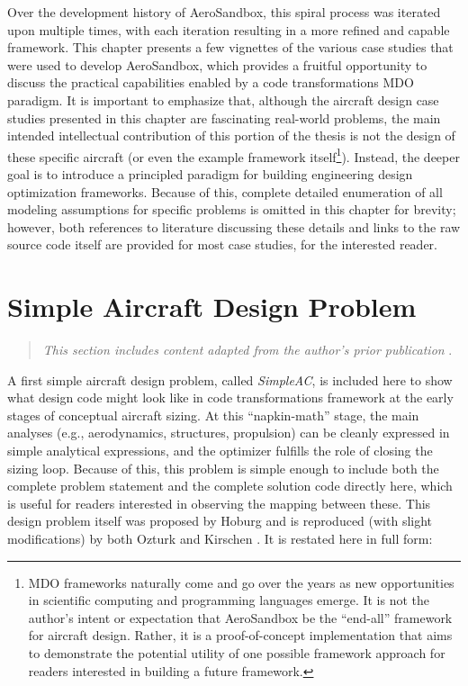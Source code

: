 Over the development history of AeroSandbox, this spiral process was iterated upon multiple times, with each iteration resulting in a more refined and capable framework. This chapter presents a few vignettes of the various case studies that were used to develop AeroSandbox, which provides a fruitful opportunity to discuss the practical capabilities enabled by a code transformations MDO paradigm. It is important to emphasize that, although the aircraft design case studies presented in this chapter are fascinating real-world problems, the main intended intellectual contribution of this portion of the thesis is not the design of these specific aircraft (or even the example framework itself\footnote{MDO frameworks naturally come and go over the years as new opportunities in scientific computing and programming languages emerge. It is not the author's intent or expectation that AeroSandbox be the ``end-all'' framework for aircraft design. Rather, it is a proof-of-concept implementation that aims to demonstrate the potential utility of one possible framework approach for readers interested in building a future framework.}). Instead, the deeper goal is to introduce a principled paradigm for building engineering design optimization frameworks. Because of this, complete detailed enumeration of all modeling assumptions for specific problems is omitted in this chapter for brevity; however, both references to literature discussing these details and links to the raw source code itself are provided for most case studies, for the interested reader.


\section{Simple Aircraft Design Problem}
\label{sec:simpleac}

\begin{quote}
    \emph{This section includes content adapted from the author's prior publication} \cite{sharpe_aerosandbox_2021}.
\end{quote}

A first simple aircraft design problem, called \emph{SimpleAC}, is included here to show what design code might look like in code transformations framework at the early stages of conceptual aircraft sizing. At this ``napkin-math'' stage, the main analyses (e.g., aerodynamics, structures, propulsion) can be cleanly expressed in simple analytical expressions, and the optimizer fulfills the role of closing the sizing loop. Because of this, this problem is simple enough to include both the complete problem statement and the complete solution code directly here, which is useful for readers interested in observing the mapping between these. This design problem itself was proposed by Hoburg \cite{hoburg} and is reproduced (with slight modifications) by both Ozturk \cite{Ozturk2018} and Kirschen \cite{kirschen}. It is restated here in full form:

